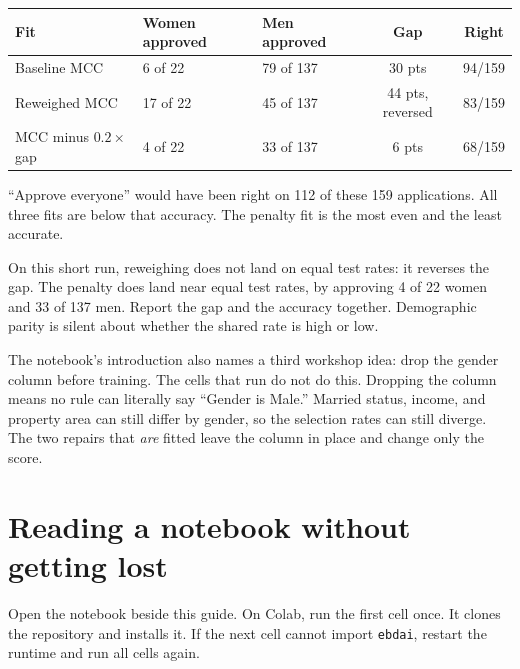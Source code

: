 \documentclass[11pt]{article}
\newcommand{\fn}[1]{\texttt{\small #1}}
\begin{document}
\begin{table}[H]
\centering
\small
\begin{tabularx}{\textwidth}{@{}l Y Y c c@{}}
\toprule
Fit & Women approved & Men approved & Gap & Right \\
\midrule
Baseline MCC & 6 of 22 & 79 of 137 & 30 pts & 94/159 \\
Reweighed MCC & 17 of 22 & 45 of 137 & 44 pts, reversed & 83/159 \\
MCC minus \(0.2\times\)gap & 4 of 22 & 33 of 137 & 6 pts & 68/159 \\
\bottomrule
\end{tabularx}
\end{table}

\noindent
``Approve everyone'' would have been right on 112 of these 159 applications. All three fits are below that accuracy. The penalty fit is the most even and the least accurate.

\begin{lesson}
On this short run, reweighing does not land on equal test rates: it reverses the gap. The penalty does land near equal test rates, by approving 4 of 22 women and 33 of 137 men. Report the gap and the accuracy together. Demographic parity is silent about whether the shared rate is high or low.
\end{lesson}

The notebook's introduction also names a third workshop idea: drop the gender column before training. The cells that run do not do this. Dropping the column means no rule can literally say ``Gender is Male.'' Married status, income, and property area can still differ by gender, so the selection rates can still diverge. The two repairs that \emph{are} fitted leave the column in place and change only the score.

\section{Reading a notebook without getting lost}
\label{sec:howto}

Open the notebook beside this guide. On Colab, run the first cell once. It clones the repository and installs it. If the next cell cannot import \fn{ebdai}, restart the runtime and run all cells again.
\end{document}
